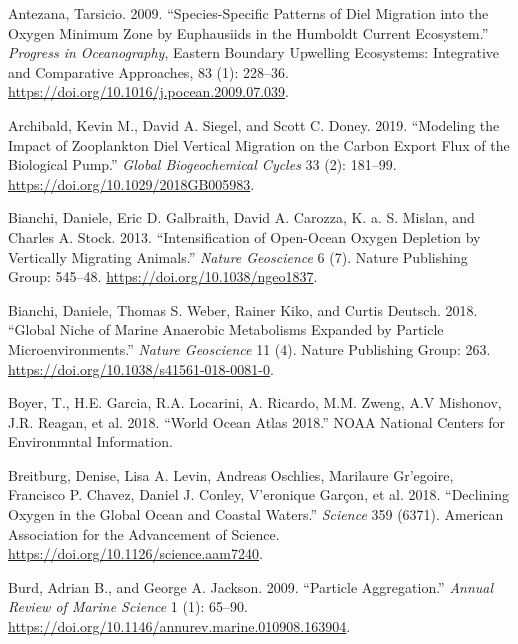 \documentclass[]{article}
\begin{document}
\leavevmode\hypertarget{ref-antezanaSpeciesspecificPatternsDiel2009}{}%
Antezana, Tarsicio. 2009. ``Species-Specific Patterns of Diel Migration
into the Oxygen Minimum Zone by Euphausiids in the Humboldt Current
Ecosystem.'' \emph{Progress in Oceanography}, Eastern Boundary Upwelling
Ecosystems: Integrative and Comparative Approaches, 83 (1): 228--36.
\url{https://doi.org/10.1016/j.pocean.2009.07.039}.

\leavevmode\hypertarget{ref-archibaldModelingImpactZooplankton2019}{}%
Archibald, Kevin M., David A. Siegel, and Scott C. Doney. 2019.
``Modeling the Impact of Zooplankton Diel Vertical Migration on the
Carbon Export Flux of the Biological Pump.'' \emph{Global Biogeochemical
Cycles} 33 (2): 181--99. \url{https://doi.org/10.1029/2018GB005983}.

\leavevmode\hypertarget{ref-bianchiIntensificationOpenoceanOxygen2013}{}%
Bianchi, Daniele, Eric D. Galbraith, David A. Carozza, K. a. S. Mislan,
and Charles A. Stock. 2013. ``Intensification of Open-Ocean Oxygen
Depletion by Vertically Migrating Animals.'' \emph{Nature Geoscience} 6
(7). Nature Publishing Group: 545--48.
\url{https://doi.org/10.1038/ngeo1837}.

\leavevmode\hypertarget{ref-bianchiGlobalNicheMarine2018}{}%
Bianchi, Daniele, Thomas S. Weber, Rainer Kiko, and Curtis Deutsch.
2018. ``Global Niche of Marine Anaerobic Metabolisms Expanded by
Particle Microenvironments.'' \emph{Nature Geoscience} 11 (4). Nature
Publishing Group: 263. \url{https://doi.org/10.1038/s41561-018-0081-0}.

\leavevmode\hypertarget{ref-boyerWorldOceanAtlas2018}{}%
Boyer, T., H.E. Garcia, R.A. Locarini, A. Ricardo, M.M. Zweng, A.V
Mishonov, J.R. Reagan, et al. 2018. ``World Ocean Atlas 2018.'' NOAA
National Centers for Environmntal Information.

\leavevmode\hypertarget{ref-breitburgDecliningOxygenGlobal2018}{}%
Breitburg, Denise, Lisa A. Levin, Andreas Oschlies, Marilaure
Gr\a'egoire, Francisco P. Chavez, Daniel J. Conley, V\a'eronique Garçon,
et al. 2018. ``Declining Oxygen in the Global Ocean and Coastal
Waters.'' \emph{Science} 359 (6371). American Association for the
Advancement of Science. \url{https://doi.org/10.1126/science.aam7240}.

\leavevmode\hypertarget{ref-burdParticleAggregation2009}{}%
Burd, Adrian B., and George A. Jackson. 2009. ``Particle Aggregation.''
\emph{Annual Review of Marine Science} 1 (1): 65--90.
\url{https://doi.org/10.1146/annurev.marine.010908.163904}.
\end{document}
